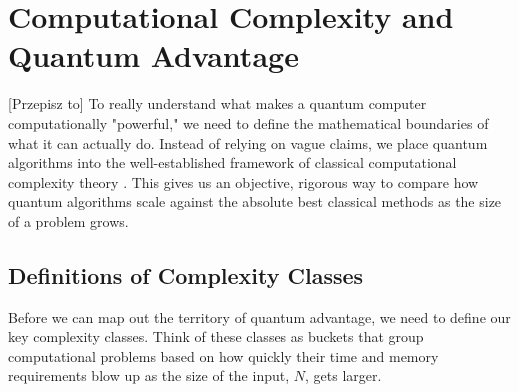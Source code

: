 \section{Computational Complexity and Quantum Advantage}

[Przepisz to]
To really understand what makes a quantum computer computationally "powerful," we need to define the mathematical boundaries of what it can actually do. 
Instead of relying on vague claims, we place quantum algorithms into the well-established framework of classical computational complexity theory \cite{arora2009computational}. 
This gives us an objective, rigorous way to compare how quantum algorithms scale against the absolute best classical methods as the size of a problem grows.

\subsection{Definitions of Complexity Classes}
Before we can map out the territory of quantum advantage, we need to define our key complexity classes. 
Think of these classes as buckets that group computational problems based on how quickly their time and memory requirements blow up as the size of the input, $N$, gets larger.

